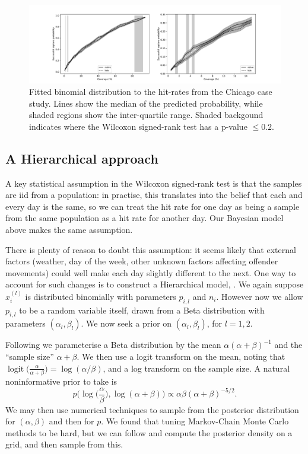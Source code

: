 \documentclass[twoside,a4paper,twocolumn,10pt]{article}
\theoremstyle{plain}
\theoremstyle{definition}
\begin{document}
\begin{figure}
	\includegraphics[width=\textwidth]{../details/fit_bin.pdf}
  \caption{Fitted binomial distribution to the hit-rates from the Chicago case study.
	Lines show the median of the predicted probability, while shaded regions show the
	inter-quartile range.  Shaded backgound indicates where the Wilcoxon signed-rank test has
	a p-value $\leq 0.2$.}
   \label{fig:fit_bin}
\end{figure}



\subsection{A Hierarchical approach}\label{sec:hmodel}

A key statistical assumption in the Wilcoxon signed-rank test is that the samples are iid
from a population: in practise, this translates into the belief that each and every day is
the same, so we can treat the hit rate for one day as being a sample from the same population
as a hit rate for another day.  Our Bayesian model above makes the same assumption.

There is plenty of reason to doubt this assumption: it seems likely that external factors
(weather, day of the week, other unknown factors affecting offender movements) could well
make each day slightly different to the next.  One way to account for such changes is to
construct a Hierarchical model, \cite[Chapter~5]{gcsr}.  We again suppose $x^{(l)}_i$ is
distributed binomially with parameters $p_{i,l}$ and $n_i$.  However now we allow $p_{i,l}$
to be a random variable itself, drawn from a Beta distribution with parameters
$(\alpha_l, \beta_l)$.  We now seek a prior on $(\alpha_l, \beta_l)$, for $l=1,2$.

Following \cite[Chapter~5]{gcsr} we parameterise a Beta distribution by the mean
$\alpha (\alpha+\beta)^{-1}$ and the ``sample size'' $\alpha+\beta$.  We then use a logit
transform on the mean, noting that $\operatorname{logit}\big(\frac{\alpha}{\alpha+\beta}\big)
= \log(\alpha / \beta)$, and a log transform on the sample size.  A natural noninformative
prior to take is
\[ p\Big( \log\big(\frac{\alpha}{\beta}\big), \log(\alpha+\beta) \Big)
\propto \alpha \beta (\alpha+\beta)^{-5/2}. \]
We may then use numerical techniques to sample from the posterior distribution for
$(\alpha,\beta)$ and then for $p$.  We found that tuning Markov-Chain Monte Carlo
methods to be hard, but we can follow \cite[Chapter~5]{gcsr} and compute the posterior
density on a grid, and then sample from this.
\end{document}
